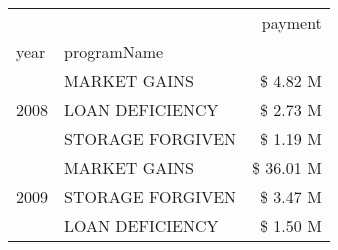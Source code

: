 \begin{tabular}{llr}
\toprule
 &  & payment \\
year & programName &  \\
\midrule
\multirow[t]{3}{*}{2008} & MARKET GAINS & \$ 4.82 M \\
 & LOAN DEFICIENCY & \$ 2.73 M \\
 & STORAGE FORGIVEN & \$ 1.19 M \\
\cline{1-3}
\multirow[t]{3}{*}{2009} & MARKET GAINS & \$ 36.01 M \\
 & STORAGE FORGIVEN & \$ 3.47 M \\
 & LOAN DEFICIENCY & \$ 1.50 M \\
\cline{1-3}
\bottomrule
\end{tabular}

